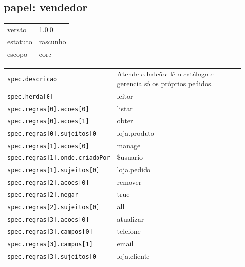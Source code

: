 \subsection*{papel: vendedor}
\begin{tabular}{@{}ll@{}}
versão & 1.0.0 \\
estatuto & rascunho \\
escopo & core \\
\end{tabular}

\begin{tabular}{@{}p{0.35\linewidth}p{0.6\linewidth}@{}}
\texttt{spec.descricao} & Atende o balcão: lê o catálogo e gerencia só os próprios pedidos. \\
\texttt{spec.herda[0]} & leitor \\
\texttt{spec.regras[0].acoes[0]} & listar \\
\texttt{spec.regras[0].acoes[1]} & obter \\
\texttt{spec.regras[0].sujeitos[0]} & loja.produto \\
\texttt{spec.regras[1].acoes[0]} & manage \\
\texttt{spec.regras[1].onde.criadoPor} & \$usuario \\
\texttt{spec.regras[1].sujeitos[0]} & loja.pedido \\
\texttt{spec.regras[2].acoes[0]} & remover \\
\texttt{spec.regras[2].negar} & true \\
\texttt{spec.regras[2].sujeitos[0]} & all \\
\texttt{spec.regras[3].acoes[0]} & atualizar \\
\texttt{spec.regras[3].campos[0]} & telefone \\
\texttt{spec.regras[3].campos[1]} & email \\
\texttt{spec.regras[3].sujeitos[0]} & loja.cliente \\
\end{tabular}
